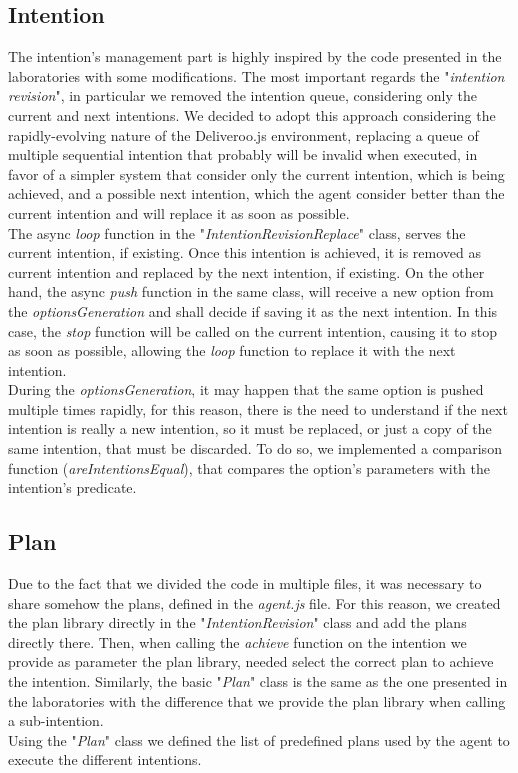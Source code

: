     \subsection{Intention}
        The intention's management part is highly inspired by the code presented in the laboratories with some modifications. The most important regards the "\textit{intention revision}", in particular we removed the intention queue, considering only the current and next intentions. We decided to adopt this approach considering the rapidly-evolving nature of the Deliveroo.js environment, replacing a queue of multiple sequential intention that probably will be invalid when executed, in favor of a simpler system that consider only the current intention, which is being achieved, and a possible next intention, which the agent consider better than the current intention and will replace it as soon as possible.
        \medskip\\
        The async \textit{loop} function in the "\textit{IntentionRevisionReplace}" class, serves the current intention, if existing. Once this intention is achieved, it is removed as current intention and replaced by the next intention, if existing. On the other hand, the async \textit{push} function in the same class, will receive a new option from the \textit{optionsGeneration} and shall decide if saving it as the next intention. In this case, the \textit{stop} function will be called on the current intention, causing it to stop as soon as possible, allowing the \textit{loop} function to replace it with the next intention.
        \medskip\\
        During the \textit{optionsGeneration}, it may happen that the same option is pushed multiple times rapidly, for this reason, there is the need to understand if the next intention is really a new intention, so it must be replaced, or just a copy of the same intention, that must be discarded. To do so, we implemented a comparison function (\textit{areIntentionsEqual}), that compares the option's parameters with the intention's predicate.

    \subsection{Plan}
        Due to the fact that we divided the code in multiple files, it was necessary to share somehow the plans, defined in the \textit{agent.js} file. For this reason, we created the plan library directly in the "\textit{IntentionRevision}" class and add the plans directly there. Then, when calling the \textit{achieve} function on the intention we provide as parameter the plan library, needed select the correct plan to achieve the intention. Similarly, the basic "\textit{Plan}" class is the same as the one presented in the laboratories with the difference that we provide the plan library when calling a sub-intention.
        \medskip\\
        Using the "\textit{Plan}" class we defined the list of predefined plans used by the agent to execute the different intentions.

